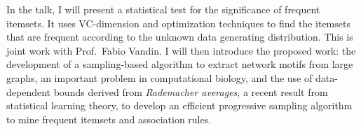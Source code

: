 \documentclass[12pt]{article}
\begin{document}
In the talk, I will present a statistical test for the significance of frequent itemsets.
It uses VC-dimension and optimization techniques to find the itemsets that are
frequent according to the unknown data generating distribution.
This is joint work with Prof.~Fabio Vandin. I will then introduce the proposed
work: the development of a sampling-based algorithm to extract network motifs
from large graphs, an important problem in computational biology, %
and the use of data-dependent bounds derived from \emph{Rademacher averages}, a
recent result from statistical learning theory, to develop an efficient
progressive sampling algorithm to mine frequent itemsets and association rules.
\end{document}
